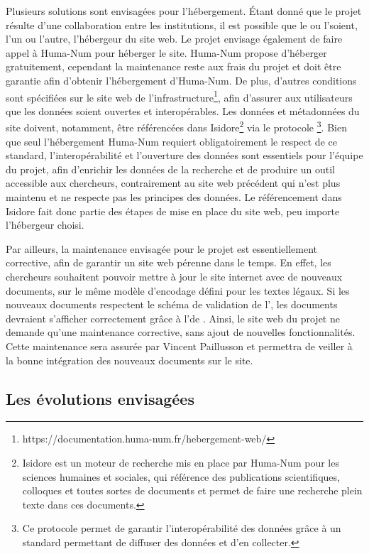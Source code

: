 Plusieurs solutions sont envisagées pour l'hébergement. Étant donné que le projet résulte d'une collaboration entre les institutions, il est possible que le \cdf ou l'\EFEO soient, l'un ou l'autre, l'hébergeur du site web. Le projet envisage également de faire appel à Huma-Num pour héberger le site. Huma-Num propose d'héberger gratuitement, cependant la maintenance reste aux frais du projet et doit être garantie afin d'obtenir l'hébergement d'Huma-Num. De plus, d'autres conditions sont spécifiées sur le site web de l'infrastructure\footnote{https://documentation.huma-num.fr/hebergement-web/}, afin d'assurer aux utilisateurs que les données soient ouvertes et interopérables. Les données et métadonnées du site doivent, notamment, être référencées dans Isidore\footnote{Isidore est un moteur de recherche mis en place par Huma-Num pour les sciences humaines et sociales, qui référence des publications scientifiques, colloques et toutes sortes de documents et permet de faire une recherche plein texte dans ces documents.} via le protocole \oai \footnote{Ce protocole permet de garantir l'interopérabilité des données grâce à un standard permettant de diffuser des données et d'en collecter.}. Bien que seul l'hébergement Huma-Num requiert obligatoirement le respect de ce standard, l'interopérabilité et l'ouverture des données sont essentiels pour l'équipe du projet, afin d'enrichir les données de la recherche et de produire un outil accessible aux chercheurs, contrairement au site web précédent qui n'est plus maintenu et ne respecte pas les principes \fair des données. Le référencement dans Isidore fait donc partie des étapes de mise en place du site web, peu importe l'hébergeur choisi. 

Par ailleurs, la maintenance envisagée pour le projet \COREL est essentiellement corrective, afin de garantir un site web pérenne dans le temps. En effet, les chercheurs souhaitent pouvoir mettre à jour le site internet avec de nouveaux documents, sur le même modèle d'encodage défini pour les textes légaux. Si les nouveaux documents \TEI respectent le schéma de validation de l'\ODD, les documents devraient s'afficher correctement grâce à l'\ODD de \tp. Ainsi, le site web du projet ne demande qu'une maintenance corrective, sans ajout de nouvelles fonctionnalités. Cette maintenance sera assurée par Vincent Paillusson et permettra de veiller à la bonne intégration des nouveaux documents sur le site. 

\subsection{Les évolutions envisagées}

